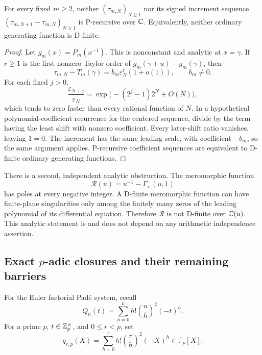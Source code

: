 \begin{theorem}
\label{thm:transfer-nonholonomy}
For every fixed \(m\ge2\), neither \((\tau_{m,N})_{N\ge1}\) nor its
signed increment sequence
\((\tau_{m,N+1}-\tau_{m,N})_{N\ge1}\) is P-recursive over \(\mathbb C\).
Equivalently, neither ordinary generating function is D-finite.
\end{theorem}

\begin{proof}
Let \(g_m(x)=P_m(x^{-1})\).  This is nonconstant and analytic at
\(x=\gamma\).  If \(r\ge1\) is the first nonzero Taylor order of
\(g_m(\gamma+u)-g_m(\gamma)\), then
\[
 \tau_{m,N}-T_m(\gamma)=b_m\varepsilon_N^r(1+o(1)),
 \qquad b_m\ne0.
\]
For each fixed \(j>0\),
\[
 \frac{\varepsilon_{N+j}}{\varepsilon_N}
 =\exp\bigl(-(2^j-1)2^N+O(N)\bigr),
\]
which tends to zero faster than every rational function of \(N\).
In a hypothetical polynomial-coefficient recurrence for the centered
sequence, divide by the term having the least shift with nonzero
coefficient.  Every later-shift ratio vanishes, leaving \(1=0\).  The
increment has the same leading scale, with coefficient \(-b_m\), so the
same argument applies.  P-recursive coefficient sequences are equivalent
to D-finite ordinary generating functions.
\end{proof}

There is a second, independent analytic obstruction.  The meromorphic
function
\[
 \mathscr R(u)=u^{-1}-\Gamma_{<}(u,1)
\]
has poles at every negative integer.  A D-finite meromorphic function can
have finite-plane singularities only among the finitely many zeros of the
leading polynomial of its differential equation.  Therefore
\(\mathscr R\) is not D-finite over \(\mathbb C(u)\).  This analytic statement is
\UPASS{} and does not depend on any arithmetic independence assertion.

\subsection{\texorpdfstring{Exact \(p\)-adic closures and their remaining
barriers}{Exact p-adic closures and their remaining barriers}}

For the Euler factorial Pad\'e system, recall
\[
 Q_n(t)=\sum_{h=0}^nh!\binom nh^2(-t)^h.
\]
For a prime \(p\), \(t\in\mathbb Z_p^\times\), and \(0\le r<p\), set
\[
 q_{r,p}(X)=\sum_{h=0}^rh!\binom rh^2(-X)^h\in\mathbb F_p[X].
\]

